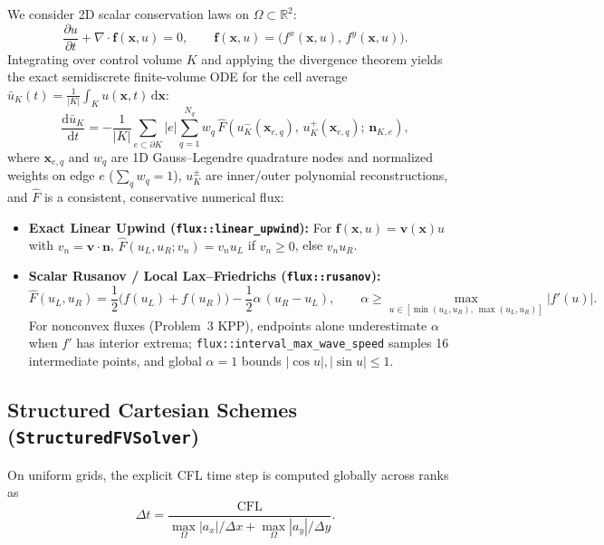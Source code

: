 \documentclass[11pt,a4paper]{article}
\theoremstyle{definition}
\newcommand{\dd}{\mathrm{d}}
\newcommand{\R}{\mathbb{R}}
\newcommand{\abs}[1]{\left\lvert #1 \right\rvert}
\newcommand{\code}[1]{\texttt{#1}}
\begin{document}
We consider 2D scalar conservation laws on $\Omega \subset \R^2$:
\begin{equation}
\label{eq:claw}
\frac{\partial u}{\partial t} + \nabla\cdot \mathbf{f}(\mathbf{x}, u) = 0,
\qquad \mathbf{f}(\mathbf{x},u) = \bigl(f^x(\mathbf{x},u),\, f^y(\mathbf{x},u)\bigr).
\end{equation}
Integrating over control volume $K$ and applying the divergence theorem yields the exact semidiscrete finite-volume ODE for the cell average $\bar{u}_K(t) = \frac{1}{|K|}\int_K u(\mathbf{x},t)\,\dd\mathbf{x}$:
\begin{equation}
\label{eq:fvm_ode}
\frac{\dd \bar{u}_K}{\dd t} = -\frac{1}{|K|} \sum_{e \subset \partial K} |e| \sum_{q=1}^{N_q} w_q\, \hat{F}\!\left(u_K^-(\mathbf{x}_{e,q}),\, u_K^+(\mathbf{x}_{e,q});\, \mathbf{n}_{K,e}\right),
\end{equation}
where $\mathbf{x}_{e,q}$ and $w_q$ are 1D Gauss--Legendre quadrature nodes and normalized weights on edge $e$ ($\sum_q w_q = 1$), $u_K^\pm$ are inner/outer polynomial reconstructions, and $\hat{F}$ is a consistent, conservative numerical flux:
\begin{itemize}
\item \textbf{Exact Linear Upwind (\code{flux::linear\_upwind}):} For $\mathbf{f}(\mathbf{x},u) = \mathbf{v}(\mathbf{x}) u$ with $v_n = \mathbf{v}\cdot\mathbf{n}$,
  $\hat{F}(u_L,u_R;v_n) = v_n u_L$ if $v_n \ge 0$, else $v_n u_R$.
\item \textbf{Scalar Rusanov / Local Lax--Friedrichs (\code{flux::rusanov}):}
  \[
  \hat{F}(u_L, u_R) = \frac{1}{2}\bigl(f(u_L) + f(u_R)\bigr) - \frac{1}{2}\alpha\,(u_R - u_L),
  \qquad \alpha \ge \max_{u \in [\min(u_L,u_R),\,\max(u_L,u_R)]} \abs{f'(u)}.
  \]
  For nonconvex fluxes (Problem~3 KPP), endpoints alone underestimate $\alpha$ when $f'$ has interior extrema; \code{flux::interval\_max\_wave\_speed} samples 16 intermediate points, and global $\alpha = 1$ bounds $|\cos u|, |\sin u| \le 1$.
\end{itemize}

\subsection{Structured Cartesian Schemes (\code{StructuredFVSolver})}

On uniform grids, the explicit CFL time step is computed globally across ranks as
\[
\Delta t = \frac{\mathrm{CFL}}{\max_{\Omega} |a_x|/\Delta x + \max_{\Omega} |a_y|/\Delta y}.
\]
\end{document}

